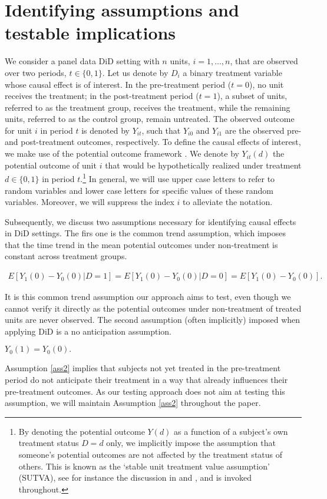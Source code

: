 {	
	\section{Identifying assumptions and testable implications}\label{Assumptions}
	We consider a panel data DiD setting with $n$ units, $i=1,\dots,n$, that are observed over two periods, $t\in \{0,1\}$.
	Let us denote by $D_i$ a binary treatment variable whose causal effect is of interest. In the pre-treatment period ($t=0$), no unit receives the treatment; in the post-treatment period ($t=1$), a subset of units, referred to as the treatment group, receives the treatment, while the remaining units, referred to as the control group, remain untreated. The observed outcome for unit $i$ in period $t$ is denoted by $Y_{it}$, such that $Y_{i0}$ and $Y_{i1}$ are the observed pre- and post-treatment outcomes, respectively. To define the causal effects of interest, we make use of the potential outcome framework \citep{Neyman23,Rubin74}. We denote by $Y_{it}(d)$ the potential outcome of unit $i$ that would be hypothetically realized under treatment $d\in\{0,1\}$ in period $t$.\footnote{By denoting the potential outcome $Y(d)$ as a function of a subject's own treatment status $D=d$ only, we implicitly impose the assumption that someone's potential outcomes are not affected by the treatment status of others. This is known as the `stable unit treatment value assumption' (SUTVA), see for instance the discussion in \citet{Rubin80} and \citet{Cox58}, and is invoked throughout.} In general, we will use upper case letters to refer to random variables and lower case letters for specific values of these random variables. Moreover, we will suppress the index $i$ to alleviate the notation.
	
Subsequently, we discuss two assumptions necessary for identifying causal effects in DiD settings. The firs one is the common trend assumption, which imposes that the time trend in the mean potential outcomes under non-treatment is constant across treatment groups.
	\begin{assumption}\label{ass1}
		\begin{eqnarray*}
			E[Y_1(0)-Y_0(0)|D=1]=E[Y_1(0)-Y_0(0)|D=0]=E[Y_1(0)-Y_0(0)].
		\end{eqnarray*}
	\end{assumption}
\noindent It is this common trend assumption our approach aims to test, even though we cannot verify it directly as the potential outcomes under non-treatment of treated units are never observed. The second assumption (often implicitly) imposed when applying DiD is a no anticipation assumption. 
	\begin{assumption}[No anticipation]\label{ass2}
		$
		Y_0(1)=Y_0(0).$
	\end{assumption}
	\noindent Assumption \ref{ass2} implies that subjects not yet treated in the pre-treatment period do not anticipate their treatment in a way that already influences their pre-treatment outcomes. As our testing approach does not aim at testing this assumption, we will maintain Assumption \ref{ass2} throughout the paper.
	
}
